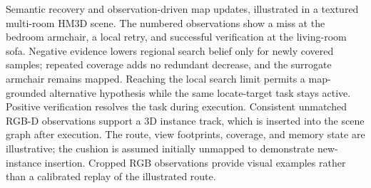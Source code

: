 \caption{Semantic recovery and observation-driven map updates, illustrated in a textured multi-room HM3D scene. The numbered observations show a miss at the bedroom armchair, a local retry, and successful verification at the living-room sofa. Negative evidence lowers regional search belief only for newly covered samples; repeated coverage adds no redundant decrease, and the surrogate armchair remains mapped. Reaching the local search limit permits a map-grounded alternative hypothesis while the same locate-target task stays active. Positive verification resolves the task during execution. Consistent unmatched RGB-D observations support a 3D instance track, which is inserted into the scene graph after execution. The route, view footprints, coverage, and memory state are illustrative; the cushion is assumed initially unmapped to demonstrate new-instance insertion. Cropped RGB observations provide visual examples rather than a calibrated replay of the illustrated route.}
\label{fig:semantic-recovery}
